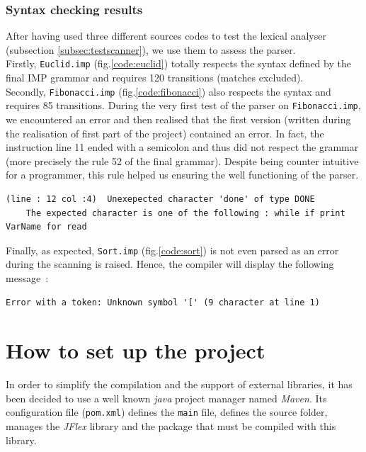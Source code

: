 \documentclass[a4paper,11pt]{article}
\begin{document}
    \subsubsection{Syntax checking results}  
      After having used three different sources codes to test the lexical analyser (subsection \ref{subsec:testscanner}), we use them to assess the parser.\\
      Firstly, \verb|Euclid.imp| (fig.\ref{code:euclid}) totally respects the syntax defined by the final IMP grammar and requires 120 transitions (matches excluded).\\ %
      Secondly, \verb|Fibonacci.imp| (fig.\ref{code:fibonacci}) also respects the syntax and requires 85 transitions. During the very first test of the parser on \verb|Fibonacci.imp|, we encountered an error and then realised that the first version (written during the realisation of first part of the project) contained an error. In fact, the instruction line 11 ended with a semicolon and thus did not respect the grammar (more precisely the rule 52 of the final grammar). Despite being counter intuitive for a programmer, this rule helped us ensuring the well functioning of the parser.
        \begin{verbatim}
(line : 12 col :4)	Unexepected character 'done' of type DONE
    The expected character is one of the following : while if print VarName for read
        \end{verbatim}
    Finally, as expected, \verb|Sort.imp| (fig.\ref{code:sort}) is not even parsed as an error during the scanning is raised. Hence, the compiler will display the following message~:
      \begin{verbatim}
Error with a token: Unknown symbol '[' (9 character at line 1)
      \end{verbatim}

\section{How to set up the project}
  In order to simplify the compilation and the support of external libraries, it has been decided to use a well known \textit{java} project manager named \textit{Maven}. Its configuration file (\verb|pom.xml|) defines the \verb|main| file, defines the source folder, manages the \textit{JFlex} library and the package that must be compiled with this library.
\end{document}
